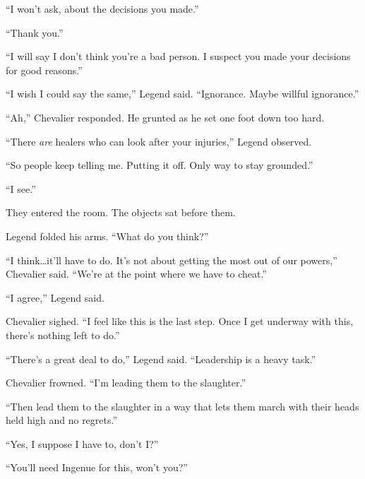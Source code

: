 ``I won't ask, about the decisions you made.''



``Thank you.''



``I will say I don't think you're a bad person.  I suspect you made your decisions for good reasons.''



``I wish I could say the same,'' Legend said.  ``Ignorance.  Maybe willful ignorance.''



``Ah,'' Chevalier responded.  He grunted as he set one foot down too hard.



``There \emph{are} healers who can look after your injuries,'' Legend observed.



``So people keep telling me.  Putting it off.  Only way to stay grounded.''



``I see.''



They entered the room.  The objects sat before them.



Legend folded his arms.  ``What do you think?''



``I think\ldots it'll have to do.  It's not about getting the most out of our powers,'' Chevalier said.  ``We're at the point where we have to cheat.''



``I agree,'' Legend said.



Chevalier sighed.  ``I feel like this is the last step.  Once I get underway with this, there's nothing left to do.''



``There's a great deal to do,'' Legend said.  ``Leadership is a heavy task.''



Chevalier frowned.  ``I'm leading them to the slaughter.''



``Then lead them to the slaughter in a way that lets them march with their heads held high and no regrets.''



``Yes, I suppose I have to, don't I?''



``You'll need Ingenue for this, won't you?''



